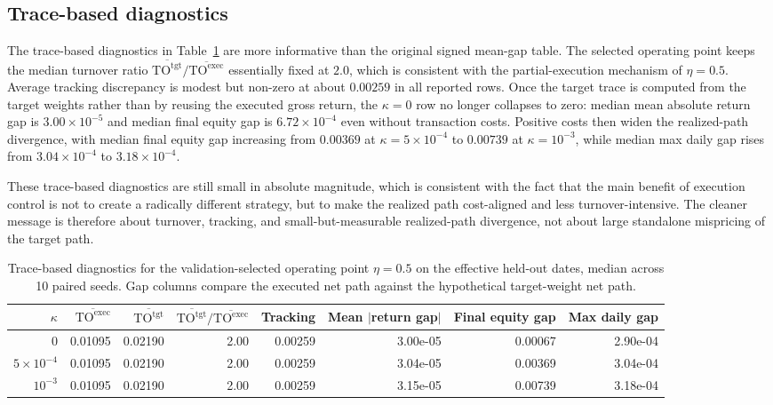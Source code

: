 \documentclass[10pt,twocolumn]{article}
\newcommand{\TOexec}{\mathrm{TO}^{\mathrm{exec}}}
\newcommand{\TOtgt}{\mathrm{TO}^{\mathrm{tgt}}}
\newcommand{\kappaTC}{\kappa}
\begin{document}
\subsection{Trace-based diagnostics}
The trace-based diagnostics in Table~\ref{tab:diagnostic_v2} are more informative than the original signed mean-gap table. The selected operating point keeps the median turnover ratio $\overline{\TOtgt}/\overline{\TOexec}$ essentially fixed at $2.0$, which is consistent with the partial-execution mechanism of $\eta=0.5$. Average tracking discrepancy is modest but non-zero at about $0.00259$ in all reported rows. Once the target trace is computed from the target weights rather than by reusing the executed gross return, the $\kappa=0$ row no longer collapses to zero: median mean absolute return gap is $3.00\times 10^{-5}$ and median final equity gap is $6.72\times 10^{-4}$ even without transaction costs. Positive costs then widen the realized-path divergence, with median final equity gap increasing from $0.00369$ at $\kappa=5\times10^{-4}$ to $0.00739$ at $\kappa=10^{-3}$, while median max daily gap rises from $3.04\times 10^{-4}$ to $3.18\times 10^{-4}$.

These trace-based diagnostics are still small in absolute magnitude, which is consistent with the fact that the main benefit of execution control is not to create a radically different strategy, but to make the realized path cost-aligned and less turnover-intensive. The cleaner message is therefore about turnover, tracking, and small-but-measurable realized-path divergence, not about large standalone mispricing of the target path.

\begin{table}[t]
\centering
\scriptsize
\caption{Trace-based diagnostics for the validation-selected operating point $\eta=0.5$ on the effective held-out dates, median across 10 paired seeds. Gap columns compare the executed net path against the hypothetical target-weight net path.}
\label{tab:diagnostic_v2}
\begin{tabular}{@{}rrrrrrrr@{}}
\toprule
$\kappaTC$ & $\overline{\TOexec}$ & $\overline{\TOtgt}$ & $\overline{\TOtgt}/\overline{\TOexec}$ & Tracking & Mean $|$return gap$|$ & Final equity gap & Max daily gap \\
\midrule
$0$ & 0.01095 & 0.02190 & 2.00 & 0.00259 & 3.00e-05 & 0.00067 & 2.90e-04 \\
$5\times10^{-4}$ & 0.01095 & 0.02190 & 2.00 & 0.00259 & 3.04e-05 & 0.00369 & 3.04e-04 \\
$10^{-3}$ & 0.01095 & 0.02190 & 2.00 & 0.00259 & 3.15e-05 & 0.00739 & 3.18e-04 \\
\bottomrule
\end{tabular}
\end{table}
\end{document}
